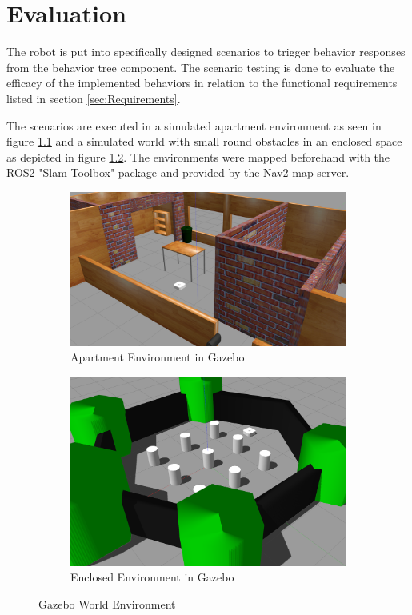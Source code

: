 \chapter{Evaluation}
\label{cha:ergebnisse}

The robot is put into specifically designed scenarios to trigger behavior responses from the behavior tree component. The scenario testing is done to evaluate the efficacy of the implemented behaviors in relation to the functional requirements listed in section \ref{sec:Requirements}.

The scenarios are executed in a simulated apartment environment as seen in figure \ref{fig:house_gazebo} and a simulated world with small round obstacles in an enclosed space as depicted in figure \ref{fig:world_gazebo}. The environments were mapped beforehand with the ROS2 "Slam Toolbox" package and provided by the Nav2 map server. 
 
\begin{figure}[ht]
	\centering
	\begin{subfigure}[b]{0.45\textwidth}
		\centering
		\includegraphics[width=\textwidth]{images/house_env.png}
		\caption{Apartment Environment in Gazebo}
		\label{fig:house_gazebo}
	\end{subfigure}
	\hfill
	\begin{subfigure}[b]{0.45\textwidth}
		\centering
		\includegraphics[width=\textwidth]{images/world_env.png}
\caption{Enclosed Environment in Gazebo}
		\label{fig:world_gazebo}
	\end{subfigure}
	\caption{Gazebo World Environment}
	\label{fig:three graphs}
\end{figure}

